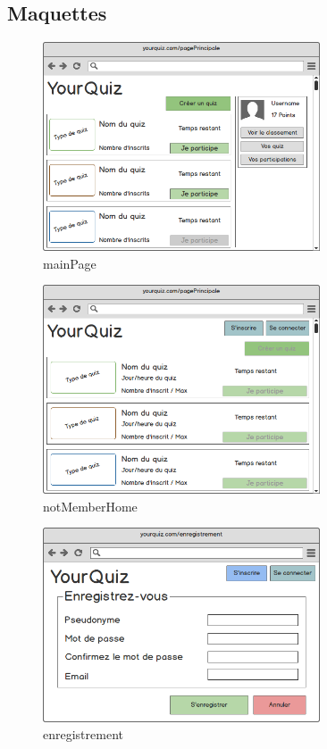 \documentclass[a4paper, 12pt]{article}
\begin{document}
\subsection{Maquettes}
\begin{figure}
	\begin{center}
		\includegraphics[width=0.73\textwidth]{../mockups/png/mainPage.png}
        \caption{mainPage}
	\end{center}
\end{figure}
\begin{figure}
	\begin{center}
		\includegraphics[width=0.73\textwidth]{../mockups/png/notMemberHome.png}
        \caption{notMemberHome}
	\end{center}
\end{figure}
\begin{figure}
	\begin{center}
		\includegraphics[width=0.73\textwidth]{../mockups/png/enregistrement.png}
        \caption{enregistrement}
	\end{center}
\end{figure}
\end{document}
